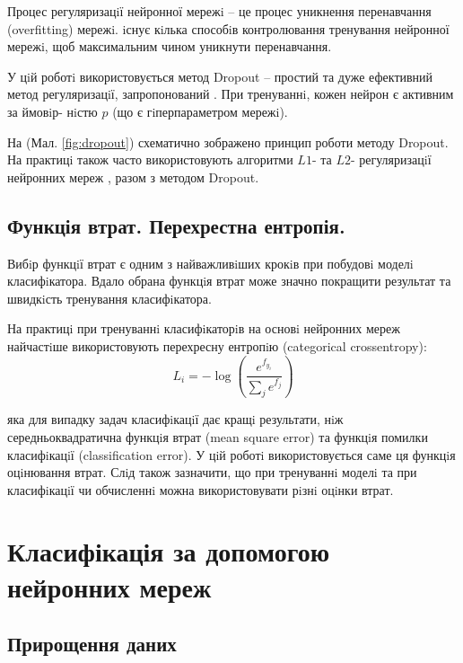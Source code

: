 Процес регуляризацiї нейронної мережi -- це процес уникнення перенавчання (overfitting) мережi. iснує кiлька способiв контролювання тренування нейронної мережi, щоб максимальним чином уникнути перенавчання.

У цiй роботi використовується метод Dropout -- простий та дуже ефективний метод регуляризацiї, запропонований \parencite{nn:dropout}. При тренуваннi, кожен нейрон є активним за ймовiр- нiстю \(p\) (що є гiперпараметром мережi).

На (Мал. \ref{fig:dropout}) схематично зображено принцип роботи методу Dropout. На практицi також часто використовують алгоритми \(L1\)- та \(L2\)- регуляризацiї нейронних мереж \citep{nn:l1l2regularization}, разом з методом Dropout.

\subsection{Функція втрат. Перехрестна ентропія.}

Вибiр функцiї втрат є одним з найважливiших крокiв при побудовi моделi класифiкатора. Вдало обрана функцiя втрат може значно покращити результат та швидкiсть тренування класифiкатора.

На практицi при тренуваннi класифiкаторiв на основi нейронних мереж найчастiше використовують перехресну ентропiю (categorical crossentropy):
\begin{equation*}
L_i = -\log\left(\frac{e^{f_{y_i}}}{ \sum_j e^{f_j} }\right)
\end{equation*}

яка для випадку задач класифiкацiї дає кращi результати, нiж середньоквадратична функцiя втрат (mean square error) та функцiя помилки класифiкацiї (classification error). У цiй роботi використовується саме ця функцiя оцiнювання втрат. Слiд також зазначити, що при тренуваннi моделi та при класифiкацiї чи обчисленнi можна використовувати рiзнi оцiнки втрат.


\section{Класифікація за допомогою нейронних мереж}


\subsection{Прирощення даних}

